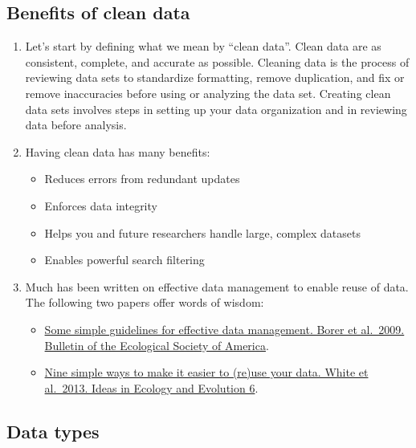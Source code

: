 \documentclass[
]{book}
\providecommand{\tightlist}{%
  \setlength{\itemsep}{0pt}\setlength{\parskip}{0pt}}
\begin{document}
\hypertarget{benefits-of-clean-data}{%
\subsection{Benefits of clean data}\label{benefits-of-clean-data}}

\begin{enumerate}
\def\labelenumi{\arabic{enumi}.}
\item
  Let's start by defining what we mean by ``clean data''. Clean data are as consistent, complete, and accurate as possible. Cleaning data is the process of reviewing data sets to standardize formatting, remove duplication, and fix or remove inaccuracies before using or analyzing the data set. Creating clean data sets involves steps in setting up your data organization and in reviewing data before analysis.
\item
  Having clean data has many benefits:

  \begin{itemize}
  \tightlist
  \item
    Reduces errors from redundant updates
  \item
    Enforces data integrity
  \item
    Helps you and future researchers handle large, complex datasets
  \item
    Enables powerful search filtering
  \end{itemize}
\item
  Much has been written on effective data management to enable reuse of data. The following two papers offer words of wisdom:

  \begin{itemize}
  \tightlist
  \item
    \href{https://www.jstor.org/stable/bullecosociamer.90.2.205}{Some simple guidelines for effective data management. Borer et al.~2009. Bulletin of the Ecological Society of America}.
  \item
    \href{https://ojs.library.queensu.ca/index.php/IEE/article/view/4608}{Nine simple ways to make it easier to (re)use your data. White et al.~2013. Ideas in Ecology and Evolution 6}.
  \end{itemize}
\end{enumerate}

\hypertarget{data-types}{%
\subsection{Data types}\label{data-types}}
\end{document}
